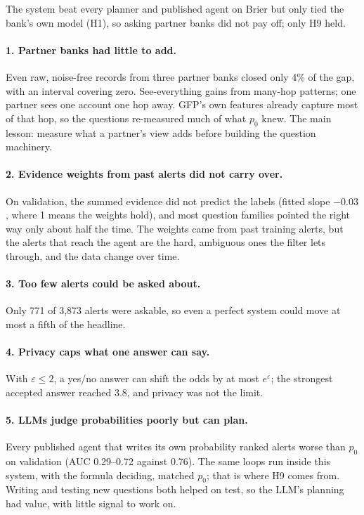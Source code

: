 \documentclass[11pt,a4paper]{article}
\newcommand{\eps}{\varepsilon}
\begin{document}
The system beat every planner and published agent on Brier but only tied the bank's own model (H1), so asking partner banks did not pay off; only H9 held.

\paragraph{1. Partner banks had little to add.} Even raw, noise-free records from three partner banks closed only 4\% of the gap, with an interval covering zero. See-everything gains from many-hop patterns; one partner sees one account one hop away. GFP's own features already capture most of that hop, so the questions re-measured much of what $p_0$ knew. The main lesson: measure what a partner's view adds before building the question machinery.

\paragraph{2. Evidence weights from past alerts did not carry over.} On validation, the summed evidence did not predict the labels (fitted slope $-0.03$, where 1 means the weights hold), and most question families pointed the right way only about half the time. The weights came from past training alerts, but the alerts that reach the agent are the hard, ambiguous ones the filter lets through, and the data change over time.

\paragraph{3. Too few alerts could be asked about.} Only 771 of 3,873 alerts were askable, so even a perfect system could move at most a fifth of the headline.

\paragraph{4. Privacy caps what one answer can say.} With $\eps\le2$, a yes/no answer can shift the odds by at most $e^{\eps}$; the strongest accepted answer reached 3.8, and privacy was not the limit.

\paragraph{5. LLMs judge probabilities poorly but can plan.} Every published agent that writes its own probability ranked alerts worse than $p_0$ on validation (AUC 0.29--0.72 against 0.76). The same loops run inside this system, with the formula deciding, matched $p_0$; that is where H9 comes from. Writing and testing new questions both helped on test, so the LLM's planning had value, with little signal to work on.
\end{document}
